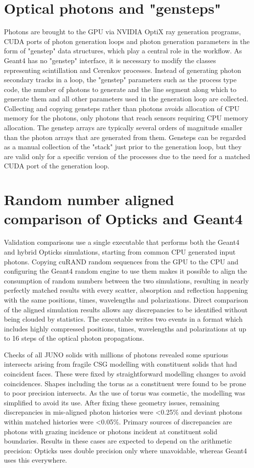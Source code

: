 \documentclass{webofc}
\begin{document}
\section{Optical photons and "gensteps"}%
%
Photons are brought to the GPU via NVIDIA OptiX ray generation programs, 
CUDA ports of photon generation loops and photon generation parameters 
in the form of "genstep" data structures, which play a central role in the workflow.
%
As Geant4 has no "genstep" interface, it is necessary to modify the classes
representing scintillation and Cerenkov processes. Instead of generating photon
secondary tracks in a loop, the "genstep" parameters such as   
the process type code, the number of photons to generate and the line segment along which to generate
them and all other parameters used in the generation loop are collected. 
Collecting and copying gensteps rather than photons avoids
allocation of CPU memory for the photons, only photons that reach sensors
requiring CPU memory allocation. 
The genstep arrays are typically several orders of magnitude smaller than the photon arrays 
that are generated from them.   
%
Gensteps can be regarded as a manual collection of the "stack" just 
prior to the generation loop, but they are valid only for a specific version of the processes 
due to the need for a matched CUDA port of the generation loop.  
%
%
%
\section{Random number aligned comparison of Opticks and Geant4}
\label{validation}
%
Validation comparisons use a single executable that performs both
the Geant4 and hybrid Opticks simulations, starting from common CPU generated input photons. 
Copying cuRAND random sequences from the GPU to the CPU and configuring the Geant4 random engine to use them makes it possible to align the 
consumption of random numbers between the two simulations, resulting in nearly perfectly matched results with every scatter, 
absorption and reflection happening with the same positions, times, wavelengths and polarizations.
Direct comparison of the aligned simulation results allows any discrepancies to be identified without
being clouded by statistics.
The executable writes two events in a format which includes highly compressed positions, times, wavelengths 
and polarizations at up to 16 steps of the optical photon propagations.

Checks of all JUNO solids with millions of photons revealed some spurious intersects  
arising from fragile CSG modelling with constituent solids that had coincident faces.  
These were fixed by straightforward modelling changes to avoid coincidences. 
Shapes including the torus as a constituent were found to be prone to poor precision intersects. 
As the use of torus was cosmetic, the modelling was simplified to avoid its use.  
After fixing these geometry issues, remaining discrepancies in mis-aligned photon histories
were <0.25\% and deviant photons within matched histories were <0.05\%. 
Primary sources of discrepancies are photons with grazing incidence or photons incident
at constituent solid boundaries. Results in these cases are expected to depend on the arithmetic precision: Opticks uses double precision 
only where unavoidable, whereas Geant4 uses this everywhere. 
%
%
\end{document}
